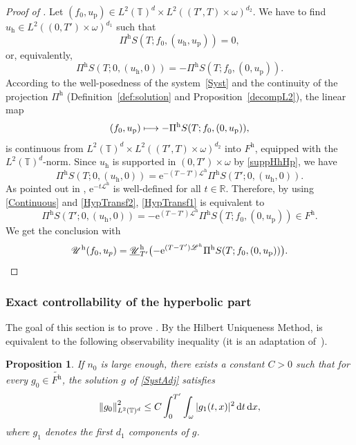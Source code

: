 \documentclass[JEP,XML,SOM,Unicode,NoEqCountersInSection]{cedram}
\let\mathcal\mathscr
\def\mto{\mathchoice{\longmapsto}{\mapsto}{\mapsto}{\mapsto}}
\theoremstyle{plain}
\newtheorem{prop}[theorem]{Proposition}
\theoremstyle{definition}
\theoremstyle{remark}
\newcommand{\norme}[1]{\left\lVert#1\right\rVert}
\newcommand{\diff}[1][-3]{\ensuremath{\mathop{}\mkern#1mu\mathrm{d}}}
\newcommand{\set}{\mathbb}
\newcommand{\R}{} %
\renewcommand{\R}{\set{R}}
\newcommand{\T}{\set{T}}
\newcommand{\h}{{\mathrm h}}
\newcommand{\p}{{\mathrm p}}
\newcommand{\eu}{\mathrm e}
\let\originalleft\left
\let\originalright\right
\renewcommand{\left}{\mathopen{}\mathclose\bgroup\originalleft}
\renewcommand{\right}{\aftergroup\egroup\originalright}
\begin{document}
\begin{proof}[Proof of ]
Let $(f_0,u_{\p})\in L^2(\T)^{d} \times L^2((T',T)\times\omega)^{d_2} $. We have to find $u_{\h} \in L^2((0,T')\times\omega)^{d_1}$ such that
\[
\Pi^{\h} S(T;f_0, (u_{\h},u_{\p})) = 0,
\]
or, equivalently,
\begin{equation}
\label{HypTransf1}
\Pi^{\h} S(T;0, (u_{\h},0))= -\Pi^{\h} S(T;f_0, (0,u_{\p})).
\end{equation}
According to the well-posedness of the system~\eqref{Syst} and the continuity of the projection $\Pi^\h$ (Definition~\ref{def:solution} and Proposition~\ref{decompL2}), the linear map
\begin{equation}
\label{Continuous}
(f_0, u_{\p}) \mto -\Pi^{\h} S(T;f_0, (0,u_{\p})),
\end{equation}
is continuous from $L^2(\T)^{d} \times L^2((T',T)\times\omega)^{d_2}$ into $F^{\h}$, equipped with the $L^2(\T)^d$-norm. Since $u_{\h}$ is supported in $(0,T')\times\omega$ by \eqref{suppHhHp}, we have
\begin{equation}
\label{HypTransf2}
\Pi^{\h} S(T;0, (u_{\h},0))= \eu^{-(T-T')\mathcal{L}^{\h}}\Pi^{\h} S(T';0, (u_{\h},0)).
\end{equation}
As pointed out in , $\eu^{-t\mathcal{L}^{\h}}$ is well-defined for all $t \in \R$. Therefore, by using \eqref{Continuous} and \eqref{HypTransf2}, \eqref{HypTransf1} is equivalent to
\begin{equation}
\label{HypTransf3}
\Pi^{\h} S(T';0, (u_{\h},0))= -\eu^{(T-T')\mathcal{L}^{\h}}\Pi^{\h} S(T;f_0, (0,u_{\p})) \in F^{\h}.
\end{equation}
We get the conclusion with
\[
\mathcal{U}^\h(f_0,u_p) = \underline{\mathcal{U}}_{T'}^{\h} \bigl(-\eu^{(T-T')\mathcal{L}^{h}}\Pi^{\h} S(T;f_0, (0,u_{\p})) \bigr).\qedhere
\]
\end{proof}

\subsubsection{Exact controllability of the hyperbolic part} \label{subsec:Hyp_NC}

The goal of this section is to prove .
By the Hilbert Uniqueness Method,  is equivalent to the following observability inequality (it is an adaptation of~\cite[Th.\,2.42]{coron_2007}).
\begin{prop}
\label{ObsHyp}
If $n_0$ is large enough, there exists a constant $C>0$ such that for every $g_0 \in \widetilde{F^{\h}}$, the solution $g$ of \eqref{SystAdj} satisfies
\begin{equation}
\label{inobsHyp}
\norme{g_0}_{L^2(\T)^{d}}^{2} \leq C \int_{0}^{T'} \int_{\omega} |g_{1}(t,x)|^{2} \diff t \diff x,
\end{equation}
where $g_{1}$ denotes the first $d_1$ components of $g$.
\end{prop}
\end{document}
